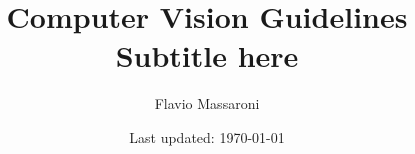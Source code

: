 \documentclass[letterpaper, 12pt]{article}
\newcommand{\1}{\mathds{1}}	%
\theoremstyle{definition}
\begin{document}

\title{Computer Vision Guidelines \\
\normalsize Subtitle here}


\author{\normalsize Flavio Massaroni}
\date{\normalsize\vspace{-1ex} Last updated: \today}


\maketitle
\tableofcontents\label{sec:contents}


















\end{document}
